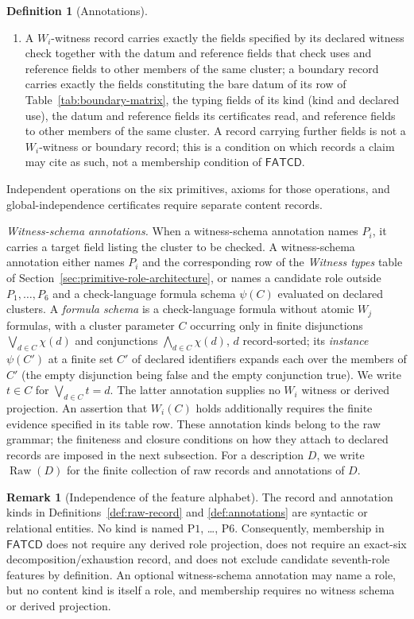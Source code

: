 \documentclass[11pt]{article}
\theoremstyle{definition}
\newtheorem{definition}[theorem]{Definition}
\newtheorem{remark}[theorem]{Remark}
\newcommand{\FATCD}{\ensuremath{\mathsf{FATCD}}}
\newcommand{\Raw}[1]{\ensuremath{\operatorname{Raw}\!\left(#1\right)}}
\newcommand{\Pone}{\ensuremath{\mathrm{P1}}}
\newcommand{\Psix}{\ensuremath{\mathrm{P6}}}
\begin{document}
\begin{definition}[Annotations]
\begin{enumerate}[label=(\arabic*),topsep=2pt,itemsep=1pt]
  \item A \(W_i\)-witness record carries exactly the fields specified by its declared witness check together with the datum and reference fields that check uses and reference fields to other members of the same cluster; a boundary record carries exactly the fields constituting the bare datum of its row of Table~\ref{tab:boundary-matrix}, the typing fields of its kind (kind and declared use), the datum and reference fields its certificates read, and reference fields to other members of the same cluster. A record carrying further fields is not a \(W_i\)-witness or boundary record; this is a condition on which records a claim may cite as such, not a membership condition of \FATCD{}.
\end{enumerate}
\noindent Independent operations on the six primitives, axioms for those operations, and global-independence certificates require separate content records.
\par\emph{Witness-schema annotations.} When a witness-schema annotation names
\(P_i\), it carries a target field listing the cluster to be checked. A
witness-schema annotation either names
\(P_i\) and the corresponding row of the \emph{Witness types} table of
Section~\ref{sec:primitive-role-architecture}, or names a candidate role
outside \(P_1,\ldots,P_6\) and
a check-language formula schema \(\psi(C)\) evaluated on declared clusters. A \emph{formula schema} is a check-language formula without atomic \(W_j\) formulas, with a cluster parameter \(C\) occurring only in finite disjunctions \(\bigvee_{d\in C}\chi(d)\) and conjunctions \(\bigwedge_{d\in C}\chi(d)\), \(d\) record-sorted; its \emph{instance} \(\psi(C')\) at a finite set \(C'\) of declared identifiers expands each over the members of \(C'\) (the empty disjunction being false and the empty conjunction true). We write \(t\in C\) for \(\bigvee_{d\in C}t=d\).
The latter annotation supplies no \(W_i\) witness or derived projection. An
assertion that \(W_i(C)\) holds additionally requires the finite evidence
specified in its table row.
These annotation kinds belong to the raw grammar; the finiteness and closure
conditions on how they attach to declared records are imposed in the next
subsection. For a description \(D\), we write \(\Raw{D}\) for the finite
collection of raw records and annotations of \(D\).
\end{definition}

\begin{remark}[Independence of the feature alphabet]\label{rem:alphabet-independence}
The record and annotation kinds in Definitions~\ref{def:raw-record} and
\ref{def:annotations} are syntactic or relational entities. No kind is named
\Pone{}, \ldots, \Psix{}. Consequently, membership in \FATCD{} does not
require any derived role projection, does not require an exact-six
decomposition/exhaustion record, and does not exclude candidate seventh-role
features by definition. An optional witness-schema annotation may name a
role, but no content kind is itself a role, and membership requires no
witness schema or derived projection.
\end{remark}
\end{document}
